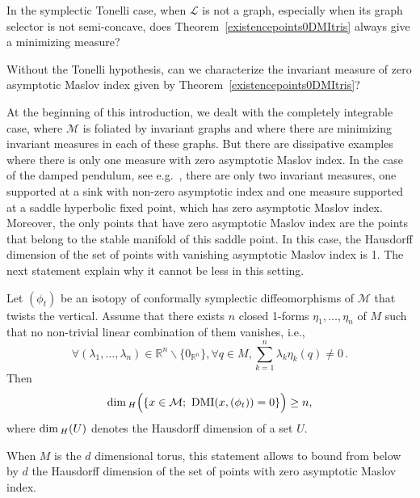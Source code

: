 \documentclass[AHL, Unicode, longabstracts, published]{cedram}
\newcommand*\M{\mathcal{M}}
\newcommand*\cl{\mathcal{L}}
\newcommand*\cal{\mathcal}
\newcommand{\DMI}{\mathrm{DMI}}
\newcommand*\R{\mathbb{R}}
\renewcommand*\dim{{\rm dim}\,}
\let\oldforall\forall
\renewcommand*{\forall}{\mathrel{\oldforall}}
\begin{document}
\begin{ques}
In the symplectic Tonelli case, when $\cl$ is not a graph, especially when its graph selector is not semi-concave, does Theorem~\ref{existencepoints0DMItris} always give a minimizing measure?
\end{ques}


\begin{ques}
Without the Tonelli hypothesis, can we characterize the invariant measure of zero asymptotic Maslov index given by Theorem~\ref{existencepoints0DMItris}?
\end{ques}


\begin{exam}
At the beginning of this introduction, we dealt with the completely integrable case, where $\cal M$ is foliated by invariant graphs and where there are minimizing invariant measures in each of these graphs. But there are dissipative examples where there is only one measure with zero asymptotic Maslov index. In the case of the damped pendulum, see e.g.~\cite{MaroSor2017}, there are only two invariant measures, one supported at a sink with non-zero asymptotic index and one measure supported at a saddle hyperbolic fixed point, which has zero asymptotic Maslov index. Moreover, the only points that have zero asymptotic Maslov index are the points that belong to the stable manifold of this saddle point. In this case, the Hausdorff dimension of the set of points with vanishing asymptotic Maslov index is 1. The next statement explain why it cannot be less in this setting.
\end{exam}

\begin{coro}\label{hausdorff dimension}
Let $(\phi_t)$ be an isotopy of conformally symplectic diffeomorphisms of $\M$ that twists the vertical. Assume that there exists $n$ closed 1-forms $\eta_1, \dots, \eta_n$ of $M$ such that no non-trivial linear combination of them vanishes, i.e.,
\[
\forall (\lambda_1, \dots, \lambda_n)\in \R^n\backslash\{ 0_{\R^n}\}, \forall q\in M, \sum_{k=1}^n\lambda_k\eta_k(q)\not=0\,.
\]
Then
\[
\dim_H\Big(\{ x\in \M ;\ \DMI(x,(\phi_t))=0 \} \Big)\geq n,
\]
where $\dim_H(U)$ denotes the Hausdorff dimension of a set $U$.
\end{coro}

\begin{rema}
When $M$ is the $d$ dimensional torus, this statement allows to bound from below by $d$ the Hausdorff dimension of the set of points with zero asymptotic Maslov index.
\end{rema}
\end{document}
